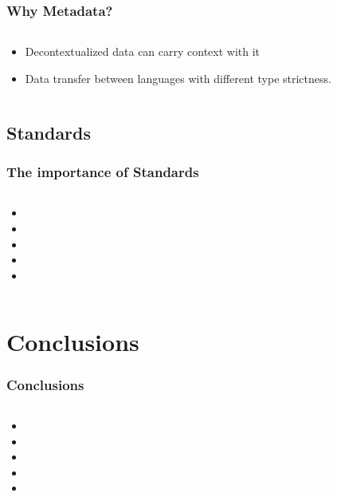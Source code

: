 \documentclass{beamer}
\begin{document}
\begin{frame}
    \frametitle{Why Metadata?}
  \begin{columns}
  \begin{column}{0.6\textwidth}

    \begin{itemize}   
    \item Decontextualized data can carry context with it
    \item Data transfer between languages with different type strictness.
    \end{itemize}
  \end{column}
  \begin{column}{0.6\textwidth}
  
  \end{column}
  
  \end{columns}
\end{frame}

\subsection{Standards}

\begin{frame}
  \frametitle{The importance of Standards}
  
  \begin{columns}
  \begin{column}{0.6\textwidth}
  \begin{itemize}
  	\item 
	\item 
	\item 
	\item 
	\item 
  \end{itemize}
  \end{column}
  \end{columns}
\end{frame}

\section[Conclusions]{Conclusions}

\begin{frame}
  \frametitle{Conclusions}
  
  \begin{columns}
  \begin{column}{0.6\textwidth}
  \begin{itemize}
  	\item 
	\item 
	\item 
	\item 
	\item 
  \end{itemize}
  \end{column}
  \end{columns}
\end{frame}
\end{document}

